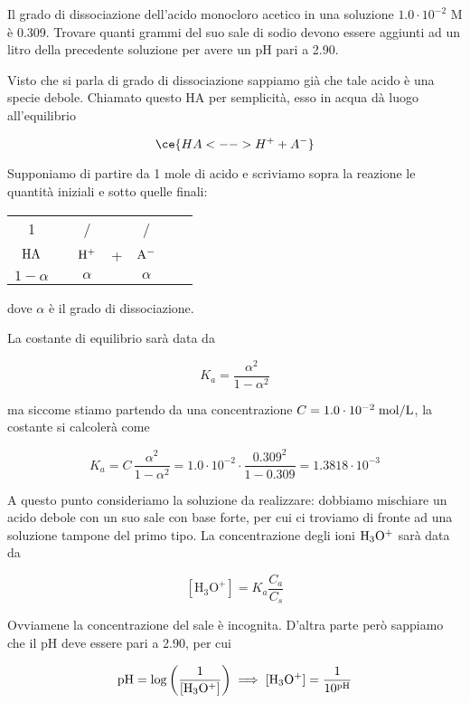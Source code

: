 \newpage

\begin{esercizio}
    Il grado di dissociazione dell'acido monocloro acetico in una soluzione $1.0 \cdot 10^{-2}$ M è 0.309. Trovare quanti grammi del suo sale di sodio devono essere aggiunti ad un litro della precedente soluzione per avere un pH pari a 2.90.
\end{esercizio}
\begin{soluzione}
    Visto che si parla di grado di dissociazione sappiamo già che tale acido è una specie debole. Chiamato questo HA per semplicità, esso in acqua dà luogo all'equilibrio

$$\ce{HA <--> H^+ + A^-}$$

Supponiamo di partire da 1 mole di acido e scriviamo sopra la reazione le quantità iniziali e sotto quelle finali:

\begin{center}
    \begin{tabular}{ccccccc}
        1 & & / & & /\\
        $\rm HA$ & \ce{<-->} & $\rm H^+$ & + & $\rm A^-$\\
        $1- \alpha$ & & $\alpha$ & & $\alpha$\\
    \end{tabular}
\end{center}

dove $\alpha$ è il grado di dissociazione.

La costante di equilibrio sarà data da

$$K_a=\frac{\alpha^2}{1-\alpha^2}$$

ma siccome stiamo partendo da una concentrazione $C=1.0 \cdot 10^{-2} \; \rm mol/L$, la costante si calcolerà come

$$K_a=C\,\frac{\alpha^2}{1-\alpha^2}
=1.0 \cdot 10^{-2} \cdot \frac{0.309^2}{1-0.309}
=1.3818 \cdot 10^{-3}$$

A questo punto consideriamo la soluzione da realizzare: dobbiamo mischiare un acido debole con un suo sale con base forte, per cui ci troviamo di fronte ad una soluzione tampone del primo tipo. La concentrazione degli ioni $\rm H_3O^+$ sarà data da

$$[\text{H}_3\text{O}^+] = K_a \frac{C_a}{C_s}$$

Ovviamene la concentrazione del sale è incognita. D'altra parte però sappiamo che il pH deve essere pari a 2.90, per cui 

$$\rm pH=\log{\left(\frac{1}{[H_3O^+]}\right)}
\implies
[H_3O^+]=\frac{1}{10^{pH}}$$


\end{soluzione}
